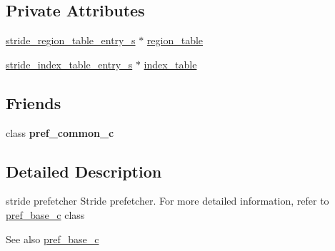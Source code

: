 \subsection*{Private Attributes}
\begin{DoxyCompactItemize}
\item 
\hyperlink{structstride__region__table__entry__struct}{stride\_\-region\_\-table\_\-entry\_\-s} $\ast$ \hyperlink{classpref__stride__c_a55067688237bc3ef1daf46fda528e38a}{region\_\-table}
\item 
\hyperlink{structstride__index__table__entry__struct}{stride\_\-index\_\-table\_\-entry\_\-s} $\ast$ \hyperlink{classpref__stride__c_af353e647ce9b0007baa0c35f55ec2e05}{index\_\-table}
\end{DoxyCompactItemize}
\subsection*{Friends}
\begin{DoxyCompactItemize}
\item 
\hypertarget{classpref__stride__c_a8d09d4836ddc352da5be834d4969b647}{
class {\bfseries pref\_\-common\_\-c}}
\label{classpref__stride__c_a8d09d4836ddc352da5be834d4969b647}

\end{DoxyCompactItemize}


\subsection{Detailed Description}
stride prefetcher Stride prefetcher. For more detailed information, refer to \hyperlink{classpref__base__c}{pref\_\-base\_\-c} class \begin{DoxySeeAlso}{See also}
\hyperlink{classpref__base__c}{pref\_\-base\_\-c} 
\end{DoxySeeAlso}


